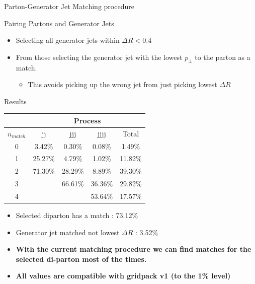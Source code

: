 \documentclass[8pt]{beamer}
\begin{document}
\begin{frame}{Parton-Generator Jet Matching procedure}

\begin{block}{Pairing Partons and Generator Jets}

\begin{itemize}
  \item Selecting all generator jets within $\Delta R < 0.4$ 
  \item From those selecting the generator jet with the lowest $p_\perp$ to the parton as a match.
  \begin{itemize}
    \item This avoids picking up the wrong jet from just picking lowest $\Delta R$
  \end{itemize}
\end{itemize}

\end{block}

\begin{block}{Results}
  
\begin{center}

\begin{tabular}{|c||c|c|c||c|}
\hline
            &          \multicolumn{4}{c|}{Process} \\
\hline
$n_{match}$ &      jj &    jjj  &    jjjj &   Total \\
\hline\hline 
          0 &  3.42\% &  0.30\% &  0.08\% &  1.49\% \\
          1 & 25.27\% &  4.79\% &  1.02\% & 11.82\% \\
          2 & 71.30\% & 28.29\% &  8.89\% & 39.30\% \\
          3 &         & 66.61\% & 36.36\% & 29.82\% \\
          4 &         &         & 53.64\% & 17.57\% \\
\hline
\end{tabular}

\end{center}

\begin{itemize}
  \item Selected diparton has a match     : 73.12\%
  \item Generator jet matched not lowest $\Delta R$ :  3.52\%
\end{itemize}

\end{block}

\begin{itemize}
  \item[] \textbf{With the current matching procedure we can find matches for the selected di-parton most of the times.}
  \item[] \textbf{All values are compatible with gridpack v1 (to the 1\% level)}
\end{itemize}


\end{frame}
\end{document}
